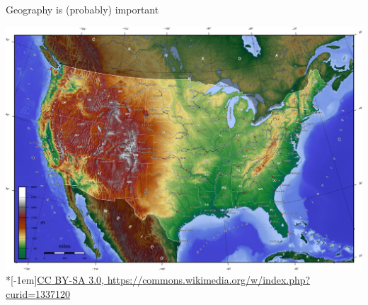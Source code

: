 \begin{frame}[fragile]{Geography is (probably) important}
    \begin{center}
        \includegraphics[width=\textwidth]{USA_topo_en}\\*[-1em]\hfill{\tiny \href{https://commons.wikimedia.org/w/index.php?curid=1337120}{CC BY-SA 3.0, https://commons.wikimedia.org/w/index.php?curid=1337120}}
    \end{center}
\end{frame}

